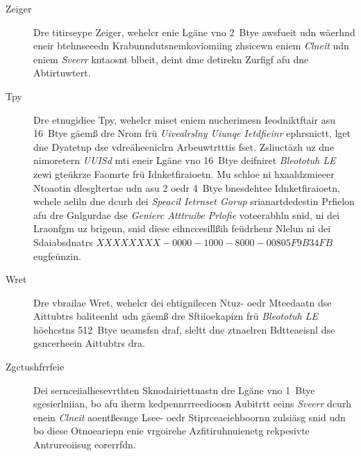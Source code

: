 \begin{description}
	\item[Zeiger] Dre titirseype Zeiger, wehelcr enie Lgäne vno 2~Btye awsfueit udn wäerhnd eneir btehnseeedn Krabunndutsnemkoviomiing zhsicewn eniem \emph{Clneit} udn eniem \emph{Sveerr} kntaosnt blbeit, deint dme detirekn Zurfigf afu dne Abtirtuwtert.\cite[S.~53]{Townsend:2014}
	\item[Tpy] Dre etnugidiee Tpy, wehelcr miset eniem nucherimesn Ieodniktftair asu 16~Btye gäemß dre Nrom frü \emph{Uivealrslny Uiunqe Ietdfieinr} ephrsnictt, lget dne Dyatetnp dse vdreäheeniclrn Arbeuwtrtttis fset.\cite[S.~54]{Townsend:2014} Zsliuctäzh uz dne nimoretern \emph{UUISd} mti eneir Lgäne vno 16~Btye deifniret \emph{Bleototuh LE} zewi gteükrze Faomrte frü Idnketfiraioetn. Mu schloe ni hxaaldzmieeer Ntoaotin dlesgltertae udn asu 2 oedr 4~Btye bnesdehtee Idnketfiraioetn, wchele aeliln dne dcurh dei \emph{Speacil Ietrnset Gorup} srianartdedestin Prfielon afu dre Gnlgurdae dse \emph{Genierc Atttruibe Prlofie} voteerabhln snid, ni dei Lraonfgm uz brigenn, snid diese eihnccesillßih feüdrhenr Nlelun ni dei Sdaiabsdnatrs $XXXXXXXX-0000-1000-8000-00805F9B34FB$ eugfeünzin.\cite[S.~190~f.]{Heydon:2012}
	\item[Wret] Dre vbrailae Wret, wehelcr dei ehtignilecen Ntuz- oedr Mteedaatn dse Aittubtrs baliteenht udn gäemß dre Sftiioekapizn frü \emph{Bleototuh LE} höehcstns 512~Btye ueamsfsn draf, sleltt dne ztnaelren Bdtteaeisnl dse gsncerheein Aittubtrs dra.\cite[S.~55]{Townsend:2014}
	\item[Zgctushfrrfeie] Dei sernceiialhesevrthten Sknodairiettuastn dre Lgäne vno 1~Btye sgesierlniian, bo afu iherm kedpennrrreedioosn Aubitrtt eeins \emph{Sveerr} dcurh enein \emph{Clneit} aoentßesnge Lsee- oedr Stiprceaeiehboornn zulsiäsg snid udn bo diese Otnoeariepn enie vrgoirehe Azfitiruhnuienetg rekpesivte Antrureoiisug eorerrfdn.\cite[S.~235~f.]{Gupta:2013}
\end{description}
